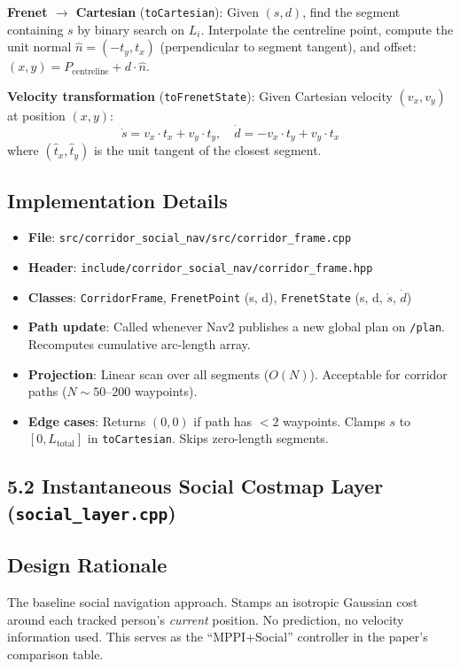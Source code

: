 \documentclass[11pt]{article}
\newcommand{\logentry}[1]{\subsection*{#1}}
\begin{document}
\textbf{Frenet $\to$ Cartesian} (\texttt{toCartesian}):
Given $(s, d)$, find the segment containing $s$ by binary search on $L_i$.
Interpolate the centreline point, compute the unit normal $\hat{n} = (-t_y, t_x)$
(perpendicular to segment tangent), and offset: $(x, y) = P_\mathrm{centreline}
+ d \cdot \hat{n}$.

\textbf{Velocity transformation} (\texttt{toFrenetState}):
Given Cartesian velocity $(v_x, v_y)$ at position $(x, y)$:
\[
  \dot{s} = v_x \cdot t_x + v_y \cdot t_y, \quad
  \dot{d} = -v_x \cdot t_y + v_y \cdot t_x
\]
where $(\hat{t}_x, \hat{t}_y)$ is the unit tangent of the closest segment.

\logentry{Implementation Details}
\begin{itemize}
  \item \textbf{File}: \texttt{src/corridor\_social\_nav/src/corridor\_frame.cpp}
  \item \textbf{Header}: \texttt{include/corridor\_social\_nav/corridor\_frame.hpp}
  \item \textbf{Classes}: \texttt{CorridorFrame}, \texttt{FrenetPoint} (s, d),
    \texttt{FrenetState} (s, d, $\dot{s}$, $\dot{d}$)
  \item \textbf{Path update}: Called whenever Nav2 publishes a new global plan
    on \texttt{/plan}. Recomputes cumulative arc-length array.
  \item \textbf{Projection}: Linear scan over all segments ($O(N)$). Acceptable
    for corridor paths ($N \sim 50$--$200$ waypoints).
  \item \textbf{Edge cases}: Returns $(0, 0)$ if path has $<2$ waypoints.
    Clamps $s$ to $[0, L_\mathrm{total}]$ in \texttt{toCartesian}.
    Skips zero-length segments.
\end{itemize}


\subsection*{5.2 Instantaneous Social Costmap Layer (\texttt{social\_layer.cpp})}

\logentry{Design Rationale}
The baseline social navigation approach. Stamps an isotropic Gaussian cost
around each tracked person's \emph{current} position. No prediction, no
velocity information used. This serves as the ``MPPI+Social'' controller
in the paper's comparison table.
\end{document}
